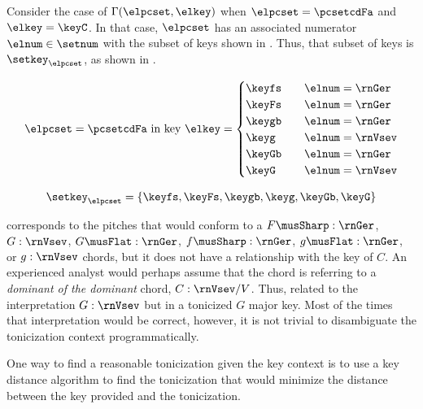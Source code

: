 
Consider the case of $\Gamma(\elpcset, \elkey)$ when
$\elpcset = \pcsetcdFa$ and $\elkey = \keyC$. In that case,
$\elpcset$ has an associated numerator $\elnum \in \setnum$
with the subset of keys shown in .
Thus, that subset of keys is $\setkey_\elpcset$, as shown in
. 

\begin{equation}
    \label{eq:key_not_found}
    \elpcset = \pcsetcdFa \text{ in key } \elkey =
    \begin{cases}
        \keyfs & \quad \elnum = \rnGer \\
        \keyFs & \quad \elnum = \rnGer \\
        \keygb & \quad \elnum = \rnGer \\
        \keyg  & \quad \elnum = \rnVsev \\
        \keyGb & \quad \elnum = \rnGer \\
        \keyG  & \quad \elnum = \rnVsev \\
    \end{cases}
\end{equation}

\begin{equation}
    \label{eq:key_not_found2}
    \setkey_\elpcset = \{ \keyfs, \keyFs, \keygb, \keyg, \keyGb, \keyG \}
\end{equation}

corresponds to the pitches that would conform to a
$F\musSharp:\rnGer$, $G:\rnVsev$, $G\musFlat:\rnGer$,
$f\musSharp:\rnGer$, $g\musFlat:\rnGer$, or $g:\rnVsev$
chords, but it does not have a relationship with the key of
$C$. An experienced analyst would perhaps assume that the
chord is referring to a \emph{dominant of the dominant}
chord, $C:\rnVsev/V$. Thus, related to the interpretation
$G:\rnVsev$ but in a tonicized $G$ major key. Most of the
times that interpretation would be correct, however, it is
not trivial to disambiguate the tonicization context
programmatically.

One way to find a reasonable tonicization given the key
context is to use a key distance algorithm to find the
tonicization that would minimize the distance between the
key provided and the tonicization.
